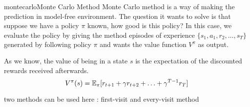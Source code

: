 \documentclass[9pt]{article}
\begin{document}
\begin{topic}{montecarlo}{Monte Carlo Method}
Monte Carlo method is a way of making the prediction in model-free environment. The question it wants to solve is that suppose we have a policy $\pi$ known, how good is this policy? In this case, we evaluate the policy by giving the method episodes of experience $\{s_1,a_1,r_2,\ldots,s_T\}$ generated by following policy $\pi$ and wants the value function $V^{\pi}$ as output.

As we know, the value of being in a state $s$ is the expectation of the discounted rewards received afterwards. 
\[
V^{\pi}(s) = \operatorname{\mathbb{E}}_{\pi}[r_{t+1} + \gamma r_{t+2} + \ldots + \gamma^{T-1}r_T]
\]

two methods can be used here : first-visit and every-visit method
\end{topic}
\end{document}
